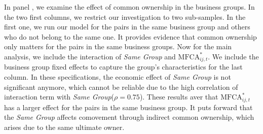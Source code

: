 	
	
	In panel , we examine the effect of common ownership in the business groups. In the two first columns, we restrict our investigation to two sub-samples. In the first one, we run our model for the pairs in the same business group and others who do not belong to the same one. It provides evidence that common ownership only matters for the pairs in the same business groups.	
	Now for the main analysis, we include the interaction of \textit{Same Group} and $\text{MFCA}^*_{ij,t}$. We include the business group fixed effects to capture the group's characteristics for the last column. In these specifications, the economic effect of \textit{Same Group} is not significant anymore, which cannot be reliable due to the high correlation of interaction term with \textit{Same Group}($\rho = 0.75$). These results aver that $\text{MFCA}^*_{ij,t}$ has a larger effect for the pairs in the same business group. It puts forward that the \textit{Same Group}  affects comovement through indirect common ownership, which arises due to the same ultimate owner. 
	
	
	
